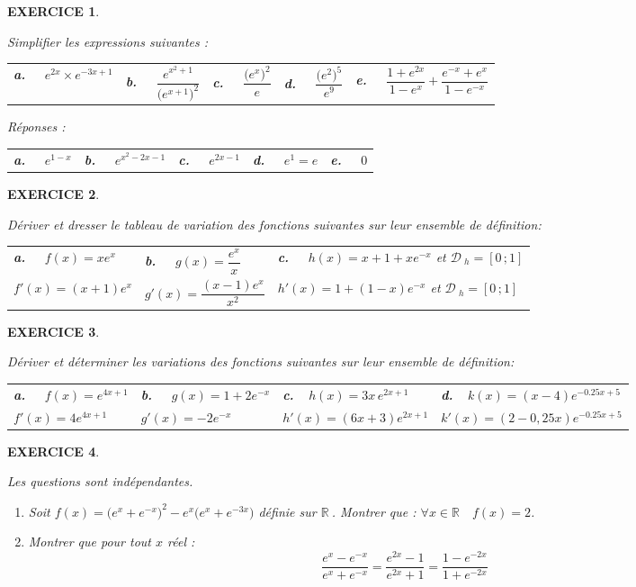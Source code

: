\documentclass[a4paper]{article}   %
\renewcommand{\(}{\left(}
\renewcommand{\)}{\right)}
\newtheorem{EXO}{\large EXERCICE }
\newenvironment{EX}   { \setcounter{ques}{0} \begin{EXO} \hrulefill ~\vspace{0.3cm}

\normalfont}    {\end{EXO} \medskip}
\newcommand{\R}{ ${\mathbb R} ~$}
\newcommand{\df}{$\mathcal{D}~$} 	%
\newcommand{\f}{\dfrac} 	%
\newcommand{\x}{\times} %
\begin{document}
\begin{EX} Simplifier les expressions suivantes :
\begin{center}\begin{tabular}{p{3cm} p{3cm}p{3cm}p{3cm}p{5cm}}
\textbf{a.~~} $e^{2x}\x e^{-3x+1} $ &\textbf{b.~~} $\f{e^{x^2+1}}{\big(e^{x+1}\big)^2}$ &\textbf{c.~~} $\f{\big(e^x\big)^2}{e}$ &\textbf{d.~~} $\f{\big(e^2\big)^5}{e^9}$&\textbf{e.~~} $\f{1+e^{2x}}{1-e^x}+\f{e^{-x}+e^{x}}{1-e^{-x}}$\\
\end{tabular}\end{center}
Réponses : 
\begin{center}\begin{tabular}{p{3cm} p{3cm}p{3cm}p{3cm}p{5cm}}
\textbf{a.~~} $e^{1-x} $ &\textbf{b.~~} $e^{x^2-2x-1}$ &\textbf{c.~~} $e^{2x-1}$ &\textbf{d.~~} $e^1=e$&\textbf{e.~~} $0$\\
\end{tabular}\end{center}
\end{EX}
\begin{EX}
 Dériver et dresser le tableau de variation des fonctions suivantes sur leur ensemble de définition:
\begin{center}\begin{tabular}{p{4cm} p{4cm}p{6cm}}
\textbf{a.~~} $f(x)=xe^x $ &\textbf{b.~~} $g(x)=\f{e^x}{x}$ &\textbf{c.~~} $h(x)=x+1+xe^{-x}$ et \df$_h=[0\, ; 1]$\\
 $f'(x)=(x+1)e^x $ &$g'(x)=\f{(x-1)e^x}{x^2}$ & $h'(x)= 1+(1-x)e^{-x}$ et \df$_h=[0\, ; 1]$\\
\end{tabular}\end{center}

\end{EX}
\begin{EX}
 Dériver et déterminer les variations des fonctions suivantes sur leur ensemble de définition:
\begin{center}\begin{tabular}{p{4cm}p{4cm}p{4cm}p{5cm}}
\textbf{a.~~} $f(x)= e^{4x+1}$ &\textbf{b.~~} $g(x)=1+2e^{-x}$ &\textbf{c.~~}$h(x)=3x\,e^{2x+1}$ &\textbf{d.~~}$k(x)=(x-4)e^{-0.25x+5}$ \\
$f'(x)= 4e^{4x+1}$ &$g'(x)=-2e^{-x}$ &$h'(x)=(6x+3)e^{2x+1}$ &$k'(x)=(2-0,25x)e^{-0.25x+5}$
\end{tabular}\end{center}
\end{EX}
\begin{EX}
Les questions sont indépendantes. 
\begin{enumerate}
\item Soit \quad $f(x)=\Big(e^x+e^{-x}\Big)^2-e^x \Big(e^x+e^{-3x}\Big)$ \quad définie sur \R. Montrer que : \qquad $\forall x \in \mathbb{R} \quad f(x)=2$.
\item Montrer que pour tout $x$ réel : 
$$\f{e^x-e^{-x}}{e^x+e^{-x}}=\f{e^{2x}-1}{e^{2x}+1}=\f{1-e^{-2x}}{1+e^{-2x}}$$
\end{enumerate}
\end{EX}
\end{document}
